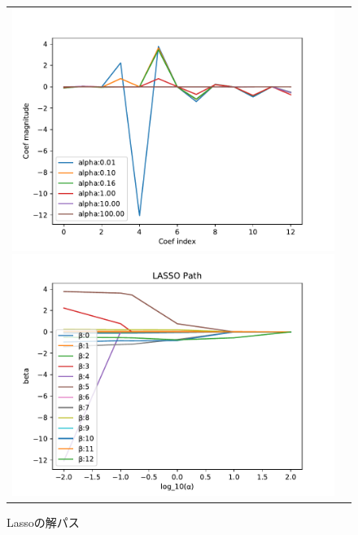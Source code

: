 \documentclass[a4paper,twocolumn]{ujarticle} %
\begin{document}
\begin{figure}[H]
    \begin{tabular}{cc}
	 \begin{minipage}{0.5\hsize}
                	\includegraphics[width=1.0\linewidth]{../img/lassoCoef.pdf}
                	\caption{Lasso}
               	\label{fig:lasso}
    	 \end{minipage}
    	 \begin{minipage}{0.5\hsize}
       		 \includegraphics[width=1.0\linewidth]{../img/lassoPath.pdf}
    		 \caption{Lassoの解パス}
    		 \label{fig:lasso_path}
    	 \end{minipage}
	\end{tabular}
\end{figure}
\end{document}
